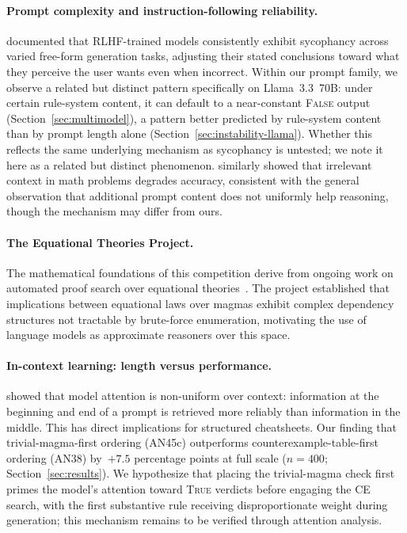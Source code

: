 \documentclass[11pt]{article}
\begin{document}
\paragraph{Prompt complexity and instruction-following reliability.}
\citet{sharma2023sycophancy} documented that RLHF-trained models
consistently exhibit sycophancy across varied free-form generation
tasks, adjusting their stated conclusions toward what they perceive the
user wants even when incorrect. Within our prompt family, we observe a
related but distinct pattern specifically on Llama~3.3~70B: under
certain rule-system content, it can default to a near-constant
\textsc{False} output (Section~\ref{sec:multimodel}), a pattern better
predicted by rule-system content than by prompt length alone
(Section~\ref{sec:instability-llama}). Whether this reflects the same
underlying mechanism as sycophancy is untested; we note it here as a
related but distinct phenomenon. \citet{shi2023distracted} similarly
showed that irrelevant context in math problems degrades accuracy,
consistent with the general observation that additional prompt content
does not uniformly help reasoning, though the mechanism may differ
from ours.

\paragraph{The Equational Theories Project.}
The mathematical foundations of this competition derive from ongoing
work on automated proof search over equational theories~\citep{tao2025etp}.
The project established that implications between equational laws over
magmas exhibit complex dependency structures not tractable by
brute-force enumeration, motivating the use of language models as
approximate reasoners over this space.

\paragraph{In-context learning: length versus performance.}
\citet{liu2023lost} showed that model attention is non-uniform over
context: information at the beginning and end of a prompt is retrieved
more reliably than information in the middle. This has direct
implications for structured cheatsheets. Our finding that
trivial-magma-first ordering (AN45c) outperforms
counterexample-table-first ordering (AN38) by~$+7.5$ percentage points
at full scale ($n=400$; Section~\ref{sec:results}). We hypothesize that
placing the
trivial-magma check first primes the model's attention toward
\textsc{True} verdicts before engaging the CE search, with the first
substantive rule receiving disproportionate weight during generation;
this mechanism remains to be verified through attention analysis.
\end{document}
